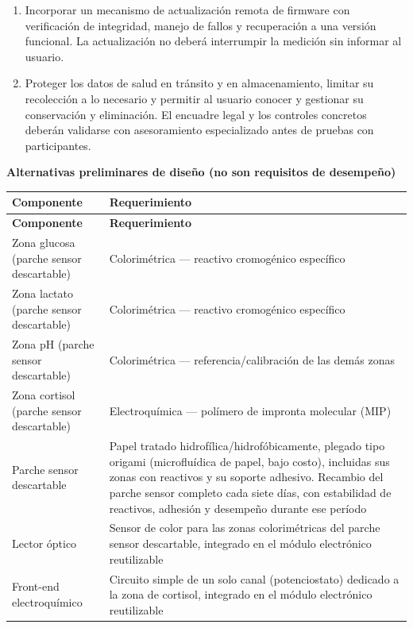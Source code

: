 \begin{enumerate}
    \item Incorporar un mecanismo de actualización remota de firmware con verificación de integridad, manejo de fallos y recuperación a una versión funcional. La actualización no deberá interrumpir la medición sin informar al usuario.
    \item Proteger los datos de salud en tránsito y en almacenamiento, limitar su recolección a lo necesario y permitir al usuario conocer y gestionar su conservación y eliminación. El encuadre legal y los controles concretos deberán validarse con asesoramiento especializado antes de pruebas con participantes.
\end{enumerate}

\noindent\textbf{Alternativas preliminares de diseño (no son requisitos de desempeño)}
\par\medskip
{\small
\renewcommand{\arraystretch}{1.2}
\begin{xltabular}{\textwidth}{|>{\raggedright\arraybackslash}p{0.28\textwidth}|>{\raggedright\arraybackslash}X|}
\hline
\textbf{Componente} & \textbf{Requerimiento} \\
\hline
\endfirsthead
\hline
\textbf{Componente} & \textbf{Requerimiento} \\
\hline
\endhead
Zona glucosa (parche sensor descartable) & Colorimétrica --- reactivo cromogénico específico \\
\hline
Zona lactato (parche sensor descartable) & Colorimétrica --- reactivo cromogénico específico \\
\hline
Zona pH (parche sensor descartable) & Colorimétrica --- referencia/calibración de las demás zonas \\
\hline
Zona cortisol (parche sensor descartable) & Electroquímica --- polímero de impronta molecular (MIP) \\
\hline
Parche sensor descartable & Papel tratado hidrofílica/hidrofóbicamente, plegado tipo origami (microfluídica de papel, bajo costo), incluidas sus zonas con reactivos y su soporte adhesivo. Recambio del parche sensor completo cada siete días, con estabilidad de reactivos, adhesión y desempeño durante ese período \\
\hline
Lector óptico & Sensor de color para las zonas colorimétricas del parche sensor descartable, integrado en el módulo electrónico reutilizable \\
\hline
Front-end electroquímico & Circuito simple de un solo canal (potenciostato) dedicado a la zona de cortisol, integrado en el módulo electrónico reutilizable \\

\end{xltabular}}
